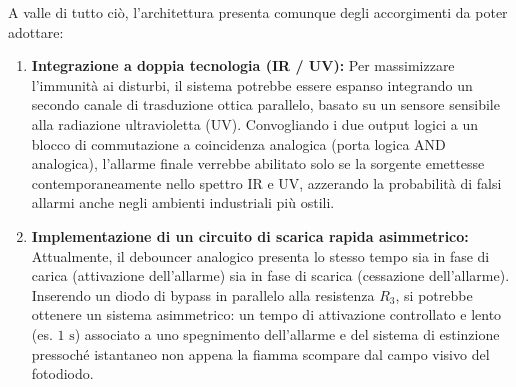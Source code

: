 \documentclass[12pt,a4paper]{article}
\begin{document}
    A valle di tutto ciò, l'architettura presenta comunque degli accorgimenti da poter adottare:

    \begin{enumerate}
        \item \textbf{Integrazione a doppia tecnologia (IR / UV):} Per massimizzare l'immunità ai disturbi, il sistema potrebbe essere espanso integrando un secondo canale di trasduzione ottica parallelo, basato su un sensore sensibile alla 
            radiazione ultravioletta (UV). Convogliando i due output logici a un blocco di commutazione a coincidenza analogica (porta logica AND analogica), l'allarme finale verrebbe abilitato solo se la sorgente emettesse contemporaneamente 
            nello spettro IR e UV, azzerando la probabilità di falsi allarmi anche negli ambienti industriali più ostili.
        \item \textbf{Implementazione di un circuito di scarica rapida asimmetrico:} Attualmente, il debouncer analogico presenta lo stesso tempo sia in fase di carica (attivazione dell'allarme) sia in fase di scarica (cessazione dell'allarme). 
            Inserendo un diodo di bypass in parallelo alla resistenza $R_3$, si potrebbe ottenere un sistema asimmetrico: un tempo di attivazione controllato e lento (es. $1\text{ s}$) associato a uno spegnimento dell'allarme e del sistema di 
            estinzione pressoché istantaneo non appena la fiamma scompare dal campo visivo del fotodiodo.
    \end{enumerate}
\end{document}
